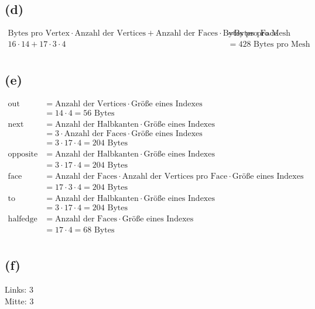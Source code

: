 \documentclass{article}
\begin{document}
\subsection*{(d)}
\[
    \begin{aligned}
        \text{Bytes pro Vertex} \cdot \text{Anzahl der Vertices} + \text{Anzahl der Faces} \cdot \text{Bytes pro Face} &= \text{Bytes pro Mesh} \\
        16 \cdot 14 + 17 \cdot 3 \cdot 4 &= 428 \text{ Bytes pro Mesh} \\
    \end{aligned}
\]

\subsection*{(e)}
\[
    \begin{aligned}
        \text{out} &= \text{Anzahl der Vertices} \cdot \text{Größe eines Indexes} \\
        &= 14 \cdot 4 = 56 \text{ Bytes} \\
        \text{next} &= \text{Anzahl der Halbkanten} \cdot \text{Größe eines Indexes} \\
        &= 3 \cdot \text{Anzahl der Faces} \cdot \text{Größe eines Indexes} \\
        &= 3 \cdot 17 \cdot 4 = 204 \text{ Bytes} \\
        \text{opposite} &= \text{Anzahl der Halbkanten} \cdot \text{Größe eines Indexes} \\
        &= 3 \cdot 17 \cdot 4 = 204 \text{ Bytes} \\
        \text{face} &= \text{Anzahl der Faces} \cdot \text{Anzahl der Vertices pro Face} \cdot \text{Größe eines Indexes} \\
        &= 17 \cdot 3 \cdot 4 = 204 \text{ Bytes} \\
        \text{to} &= \text{Anzahl der Halbkanten} \cdot \text{Größe eines Indexes} \\
        &= 3 \cdot 17 \cdot 4 = 204 \text{ Bytes} \\
        \text{halfedge} &= \text{Anzahl der Faces} \cdot \text{Größe eines Indexes} \\
        &= 17 \cdot 4 = 68 \text{ Bytes} \\
    \end{aligned}
\]

\subsection*{(f)}
Links: 3 \\ 
Mitte: 3
\end{document}
